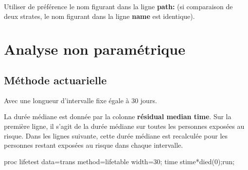 \documentclass[
  12pt,
  letterpaper,
  DIV=11,
  numbers=noendperiod,
  onepage,
  openany]{scrreprt}
\newenvironment{Shaded}{\begin{snugshade}}{\end{snugshade}}
\newcommand{\DecValTok}[1]{\textcolor[rgb]{0.86,0.86,0.80}{#1}}
\newcommand{\FunctionTok}[1]{\textcolor[rgb]{0.94,0.94,0.56}{#1}}
\newcommand{\NormalTok}[1]{\textcolor[rgb]{0.80,0.80,0.80}{#1}}
\newcommand{\OtherTok}[1]{\textcolor[rgb]{0.94,0.94,0.56}{#1}}
\newcommand{\SpecialCharTok}[1]{\textcolor[rgb]{0.86,0.64,0.64}{#1}}
\begin{document}
Utiliser de préférence le nom figurant dans la ligne \textbf{path:} (si
comparaison de deux strates, le nom figurant dans la ligne \textbf{name}
est identique).

\hypertarget{analyse-non-paramuxe9trique-2}{%
\section{Analyse non paramétrique}\label{analyse-non-paramuxe9trique-2}}

\hypertarget{muxe9thode-actuarielle-2}{%
\subsection{Méthode actuarielle}\label{muxe9thode-actuarielle-2}}

Avec une longueur d'intervalle fixe égale à 30 jours.

La durée médiane est donnée par la colonne \textbf{résidual median
time}. Sur la première ligne, il s'agit de la durée médiane sur toutes
les personnes exposées au risque. Dans les lignes suivante, cette durée
médiane est recalculée pour les personnes restant exposées au risque
dans chaque intervalle.

\begin{Shaded}
\begin{Highlighting}[]
\NormalTok{proc lifetest data}\OtherTok{=}\NormalTok{trans method}\OtherTok{=}\NormalTok{lifetable width}\OtherTok{=}\DecValTok{30}\NormalTok{;}
\NormalTok{time stime}\SpecialCharTok{*}\FunctionTok{died}\NormalTok{(}\DecValTok{0}\NormalTok{);run;}
\end{Highlighting}
\end{Shaded}
\end{document}
